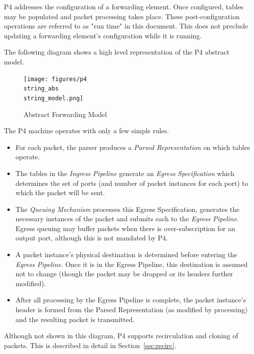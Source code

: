 \documentclass[12pt]{article}
\begin{document}
P4 addresses the configuration of a forwarding element. Once configured, tables
may be populated and packet processing takes place. These post-configuration
operations are referred to as "run time" in this document. This does not preclude
updating a forwarding element's configuration while it is running.

The following diagram shows a high level representation of the P4 abstract
model.

\begin{figure}[h!]
    \centering
    \texttt{[image: figures/p4\\string\_abs\\string\_model.png]}
    \caption{Abstract Forwarding Model}
    \label{fig:abstractmodel}
\end{figure}

The P4 machine operates with only a few simple rules.

\begin{itemize}
\item
For each packet, the parser produces a \textit{Parsed Representation}
on which \matchaction tables operate.
\item
The \matchaction tables in the \textit{Ingress Pipeline} generate an
\textit{Egress Specification }which determines the set of ports (and
number of packet instances for each port) to which the packet will be
sent.
\item
The \textit{Queuing Mechanism} processes this Egress Specification,
generates the necessary instances of the packet and submits each to
the \textit{Egress Pipeline}.  Egress queuing may buffer packets when
there is over-subscription for an output port, although this is not
mandated by P4.
\item
A packet instance's physical destination is determined before entering
the \textit{Egress Pipeline}.  Once it is in the Egress Pipeline, this
destination is assumed not to change (though the packet may be dropped
or its headers further modified).
\item
After all processing by the Egress Pipeline is complete, the packet
instance's header is formed from the Parsed Representation (as
modified by \matchaction processing) and the resulting packet is
transmitted.
\end{itemize}


Although not shown in this diagram, P4 supports recirculation and cloning
of packets.  This is described in detail in Section~\ref{sec:recirc}.
\end{document}
